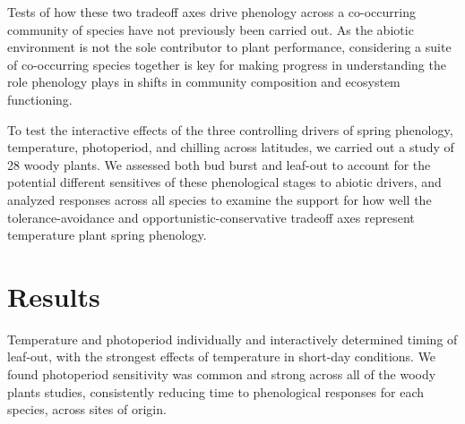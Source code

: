 \documentclass[11pt]{article}
\begin{document}

Tests of how these two tradeoff axes drive phenology across a co-occurring community of species have not previously been carried out. As the abiotic environment is not the sole contributor to plant performance, considering a suite of co-occurring species together is key for making progress in understanding the role phenology plays in shifts in community composition and ecosystem functioning. 

To test the interactive effects of the three controlling drivers of spring phenology, temperature, photoperiod, and chilling across latitudes, we carried out a study of 28 woody plants. We assessed both bud burst and leaf-out to account for the potential different sensitives of these phenological stages to abiotic drivers, and analyzed responses across all species to examine the support for how well the tolerance-avoidance and opportunistic-conservative tradeoff axes represent temperature plant spring phenology.

\section*{Results}

Temperature and photoperiod individually and interactively determined timing of leaf-out, with the strongest effects of temperature in short-day conditions. We found photoperiod sensitivity was common and strong across all of the woody plants studies, consistently reducing time to phenological responses for each species, across sites of origin. 
\end{document}
